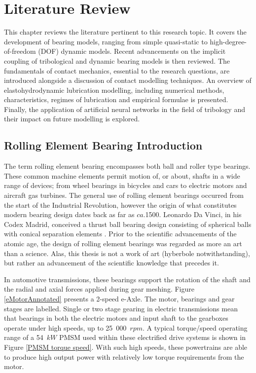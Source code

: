 \chapter{Literature Review}
\label{Literature Review}

This chapter reviews the literature pertinent to this research topic. It covers the development of bearing models, ranging from simple quasi-static to high-degree-of-freedom (DOF) dynamic models. Recent advancements on the implicit coupling of tribological and dynamic bearing models is then reviewed. The fundamentals of contact mechanics, essential to the research questions, are introduced alongside a discussion of contact modelling techniques. An overview of elastohydrodynamic lubrication modelling, including numerical methods, characteristics, regimes of lubrication and empirical formulae is presented. Finally, the application of artificial neural networks in the field of tribology and their impact on future modelling is explored.

\section{Rolling Element Bearing Introduction}

The term rolling element bearing encompasses both ball and roller type bearings. These common machine elements permit motion of, or about, shafts in a wide range of devices; from wheel bearings in bicycles and cars to electric motors and aircraft gas turbines. The general use of rolling element bearings occurred from the start of the Industrial Revolution, however the origin of what constitutes modern bearing design dates back as far as $ca.$1500. Leonardo Da Vinci, in his Codex Madrid, conceived a thrust ball bearing design consisting of spherical balls with conical separation elements \cite{Harris2007}. Prior to the scientific advancements of the atomic age, the design of rolling element bearings was regarded as more an art than a science. Alas, this thesis is not a work of art (hyberbole notwithstanding), but rather an advancement of the scientific knowledge that precedes it.

In automotive transmissions, these bearings support the rotation of the shaft and the radial and axial forces applied during gear meshing. Figure \ref{eMotorAnnotated} presents a 2-speed e-Axle. The motor, bearings and gear stages are labelled.  Single or two stage gearing in electric transmissions mean that bearings in both the electric motors and input shaft to the gearboxes operate under high speeds, up to 25~000~$rpm$. A typical torque/speed operating range of a 54~$kW$ PMSM used within these electrified drive systems is shown in Figure \ref{PMSM torque speed}. With such high speeds, these powertrains are able to produce high output power with relatively low torque requirements from the motor.


